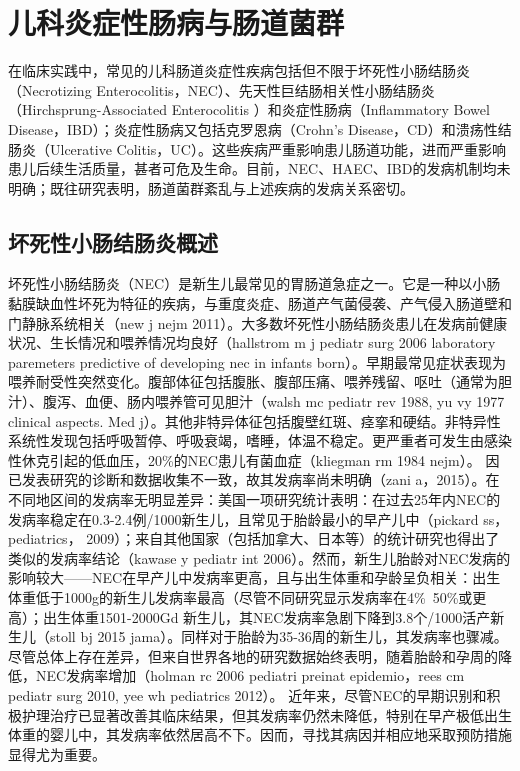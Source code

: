 \section{儿科炎症性肠病与肠道菌群}
\label{sec:enterocolitis}
在临床实践中，常见的儿科肠道炎症性疾病包括但不限于坏死性小肠结肠炎（Necrotizing Enterocolitis，NEC）、先天性巨结肠相关性小肠结肠炎（Hirchsprung-Associated Enterocolitis ）和炎症性肠病（Inflammatory Bowel Disease，IBD）；炎症性肠病又包括克罗恩病（Crohn’s Disease，CD）和溃疡性结肠炎（Ulcerative Colitis，UC）。这些疾病严重影响患儿肠道功能，进而严重影响患儿后续生活质量，甚者可危及生命。目前，NEC、HAEC、IBD的发病机制均未明确；既往研究表明，肠道菌群紊乱与上述疾病的发病关系密切。

\subsection{坏死性小肠结肠炎概述}
坏死性小肠结肠炎（NEC）是新生儿最常见的胃肠道急症之一。它是一种以小肠黏膜缺血性坏死为特征的疾病，与重度炎症、肠道产气菌侵袭、产气侵入肠道壁和门静脉系统相关（new j nejm 2011）。大多数坏死性小肠结肠炎患儿在发病前健康状况、生长情况和喂养情况均良好（hallstrom m j pediatr surg 2006 laboratory paremeters predictive of developing nec in infants born）。早期最常见症状表现为喂养耐受性突然变化。腹部体征包括腹胀、腹部压痛、喂养残留、呕吐（通常为胆汁）、腹泻、血便、肠内喂养管可见胆汁（walsh mc pediatr rev 1988, yu vy 1977 clinical aspects. Med j）。其他非特异体征包括腹壁红斑、痉挛和硬结。非特异性系统性发现包括呼吸暂停、呼吸衰竭，嗜睡，体温不稳定。更严重者可发生由感染性休克引起的低血压，20\%的NEC患儿有菌血症（kliegman rm 1984 nejm）。
因已发表研究的诊断和数据收集不一致，故其发病率尚未明确（zani a，2015）。在不同地区间的发病率无明显差异：美国一项研究统计表明：在过去25年内NEC的发病率稳定在0.3-2.4例/1000新生儿，且常见于胎龄最小的早产儿中（pickard ss，pediatrics， 2009）；来自其他国家（包括加拿大、日本等）的统计研究也得出了类似的发病率结论（kawase y pediatr int 2006）。然而，新生儿胎龄对NEC发病的影响较大——NEC在早产儿中发病率更高，且与出生体重和孕龄呈负相关：出生体重低于1000g的新生儿发病率最高（尽管不同研究显示发病率在4\%~50\%或更高）；出生体重1501-2000Gd 新生儿，其NEC发病率急剧下降到3.8个/1000活产新生儿（stoll bj 2015 jama）。同样对于胎龄为35-36周的新生儿，其发病率也骤减。尽管总体上存在差异，但来自世界各地的研究数据始终表明，随着胎龄和孕周的降低，NEC发病率增加（holman rc 2006 pediatri preinat epidemio，rees cm pediatr surg 2010, yee wh pediatrics 2012）。
近年来，尽管NEC的早期识别和积极护理治疗已显著改善其临床结果，但其发病率仍然未降低，特别在早产极低出生体重的婴儿中，其发病率依然居高不下。因而，寻找其病因并相应地采取预防措施显得尤为重要。

